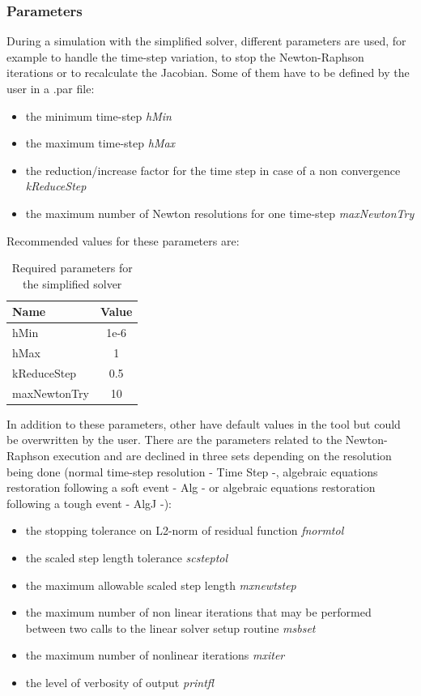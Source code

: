 \documentclass[a4paper, 12pt]{report}
\begin{document}
\subsubsection{Parameters}

During a simulation with the simplified solver, different parameters are used, for example to handle the time-step variation, to stop the Newton-Raphson iterations or to recalculate the Jacobian. Some of them have to be defined by the user in a .par file:
\begin{itemize}
\item the minimum time-step \textit{hMin}
\item the maximum time-step \textit{hMax}
\item the reduction/increase factor for the time step in case of a non convergence \textit{kReduceStep}
\item the maximum number of Newton resolutions for one time-step \textit{maxNewtonTry}
\end{itemize}

Recommended values for these parameters are:
\begin{table}[h!]
\center
\begin{tabular}{ l | c }
\toprule
\textbf{{Name}} & \textbf{{Value}} \\
\midrule
hMin & 1e-6 \\
hMax & 1 \\
kReduceStep & 0.5 \\
maxNewtonTry & 10 \\
\bottomrule
\end{tabular}
\caption{Required parameters for the simplified solver}
\end{table}

In addition to these parameters, other have default values in the tool but could be overwritten by the user. There are the parameters related to the Newton-Raphson execution and are declined in three sets depending on the resolution being done (normal time-step resolution - Time Step -, algebraic equations restoration following a soft event - Alg - or algebraic equations restoration following a tough event - AlgJ -):
\begin{itemize}
\item the stopping tolerance on L2-norm of residual function \textit{fnormtol}
\item the scaled step length tolerance \textit{scsteptol}
\item the maximum allowable scaled step length \textit{mxnewtstep}
\item the maximum number of non linear iterations that may be performed between two calls to the linear solver setup routine \textit{msbset}
\item the maximum number of nonlinear iterations \textit{mxiter}
\item the level of verbosity of output \textit{printfl}
\end{itemize}
\end{document}
